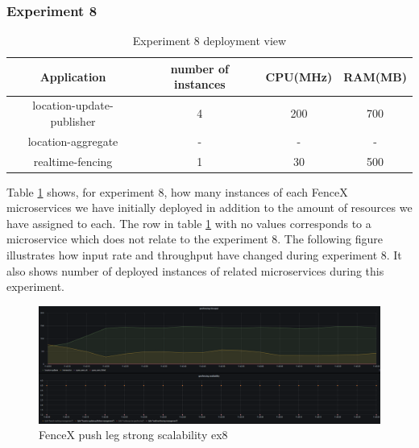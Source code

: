 \documentclass[a4]{report}
\begin{document}
    \clearpage

    \subsubsection{Experiment 8}
    \begin{table}[h!]
        \centering
        \begin{tabular}{|c|c|c|c|}
            \hline
            Application               & number of instances & CPU(MHz) & RAM(MB) \\
            \hline
            location-update-publisher & 4                   & 200      & 700     \\
            location-aggregate        & -                   & -        & -       \\
            realtime-fencing          & 1                   & 30       & 500     \\
            \hline
        \end{tabular}
        \caption{Experiment 8 deployment view}
        \label{table:ex8-dv}
    \end{table}

    Table \ref{table:ex8-dv} shows, for experiment 8, how many instances of each FenceX microservices we have initially
    deployed in addition to the amount of resources we have assigned to each.
    The row in table \ref{table:ex8-dv} with no values corresponds to a microservice which does not relate to the
    experiment 8.
    The following figure illustrates how input rate and throughput have changed during experiment 8.
    It also shows number of deployed instances of related microservices during this experiment.

    \begin{figure}[h!]
        \centering
        \caption{FenceX push leg strong scalability ex8}
        \label{fig:ex8}
        \includegraphics[width=\linewidth, scale=2]{images/evaluation/ex8-benchmarking-ongoing-2per4sec.png}
    \end{figure}
\end{document}
